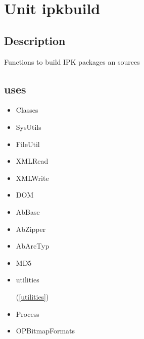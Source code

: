 \documentclass{report}
\begin{document}
\chapter{Unit ipkbuild}
\label{ipkbuild}
\section{Description}
Functions to build IPK packages an sources
\section{uses}
\begin{itemize}
\item \begin{ttfamily}Classes\end{ttfamily}\item \begin{ttfamily}SysUtils\end{ttfamily}\item \begin{ttfamily}FileUtil\end{ttfamily}\item \begin{ttfamily}XMLRead\end{ttfamily}\item \begin{ttfamily}XMLWrite\end{ttfamily}\item \begin{ttfamily}DOM\end{ttfamily}\item \begin{ttfamily}AbBase\end{ttfamily}\item \begin{ttfamily}AbZipper\end{ttfamily}\item \begin{ttfamily}AbArcTyp\end{ttfamily}\item \begin{ttfamily}MD5\end{ttfamily}\item \begin{ttfamily}utilities\end{ttfamily}(\ref{utilities})\item \begin{ttfamily}Process\end{ttfamily}\item \begin{ttfamily}OPBitmapFormats\end{ttfamily}\end{itemize}
\end{document}
